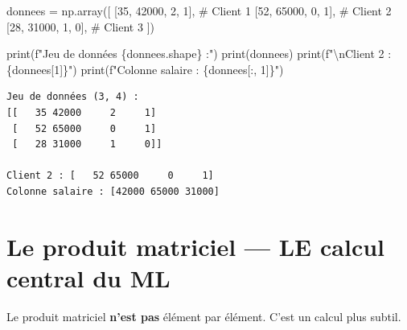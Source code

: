 \documentclass[
  french,
  11pt,
  a4paper,
]{scrbook}
\newenvironment{Shaded}{}{}
\newcommand{\BuiltInTok}[1]{\textcolor[rgb]{0.84,0.23,0.29}{#1}}
\newcommand{\CharTok}[1]{\textcolor[rgb]{0.01,0.18,0.38}{#1}}
\newcommand{\CommentTok}[1]{\textcolor[rgb]{0.42,0.45,0.49}{#1}}
\newcommand{\DecValTok}[1]{\textcolor[rgb]{0.00,0.36,0.77}{#1}}
\newcommand{\NormalTok}[1]{\textcolor[rgb]{0.14,0.16,0.18}{#1}}
\newcommand{\OperatorTok}[1]{\textcolor[rgb]{0.14,0.16,0.18}{#1}}
\newcommand{\SpecialCharTok}[1]{\textcolor[rgb]{0.00,0.36,0.77}{#1}}
\newcommand{\SpecialStringTok}[1]{\textcolor[rgb]{0.01,0.18,0.38}{#1}}
\begin{document}
\begin{Shaded}
\begin{Highlighting}[]
\NormalTok{donnees }\OperatorTok{=}\NormalTok{ np.array([}
\NormalTok{    [}\DecValTok{35}\NormalTok{, }\DecValTok{42000}\NormalTok{, }\DecValTok{2}\NormalTok{, }\DecValTok{1}\NormalTok{],   }\CommentTok{\# Client 1}
\NormalTok{    [}\DecValTok{52}\NormalTok{, }\DecValTok{65000}\NormalTok{, }\DecValTok{0}\NormalTok{, }\DecValTok{1}\NormalTok{],   }\CommentTok{\# Client 2}
\NormalTok{    [}\DecValTok{28}\NormalTok{, }\DecValTok{31000}\NormalTok{, }\DecValTok{1}\NormalTok{, }\DecValTok{0}\NormalTok{],   }\CommentTok{\# Client 3}
\NormalTok{])}

\BuiltInTok{print}\NormalTok{(}\SpecialStringTok{f"Jeu de données }\SpecialCharTok{\{}\NormalTok{donnees}\SpecialCharTok{.}\NormalTok{shape}\SpecialCharTok{\}}\SpecialStringTok{ :"}\NormalTok{)}
\BuiltInTok{print}\NormalTok{(donnees)}
\BuiltInTok{print}\NormalTok{(}\SpecialStringTok{f"}\CharTok{\textbackslash{}n}\SpecialStringTok{Client 2 : }\SpecialCharTok{\{}\NormalTok{donnees[}\DecValTok{1}\NormalTok{]}\SpecialCharTok{\}}\SpecialStringTok{"}\NormalTok{)}
\BuiltInTok{print}\NormalTok{(}\SpecialStringTok{f"Colonne salaire : }\SpecialCharTok{\{}\NormalTok{donnees[:, }\DecValTok{1}\NormalTok{]}\SpecialCharTok{\}}\SpecialStringTok{"}\NormalTok{)}
\end{Highlighting}
\end{Shaded}

\begin{verbatim}
Jeu de données (3, 4) :
[[   35 42000     2     1]
 [   52 65000     0     1]
 [   28 31000     1     0]]

Client 2 : [   52 65000     0     1]
Colonne salaire : [42000 65000 31000]
\end{verbatim}

\section{Le produit matriciel --- LE calcul central du
ML}\label{le-produit-matriciel-le-calcul-central-du-ml}

\begin{tcolorbox}[enhanced jigsaw, arc=.35mm, bottomrule=.15mm, bottomtitle=1mm, breakable, colback=white, colbacktitle=quarto-callout-warning-color!10!white, colframe=quarto-callout-warning-color-frame, coltitle=black, left=2mm, leftrule=.75mm, opacityback=0, opacitybacktitle=0.6, rightrule=.15mm, title=\textcolor{quarto-callout-warning-color}{\faExclamationTriangle}\hspace{0.5em}{⚠️ Attention}, titlerule=0mm, toprule=.15mm, toptitle=1mm]

Le produit matriciel \textbf{n'est pas} élément par élément. C'est un
calcul plus subtil.

\end{tcolorbox}
\end{document}
